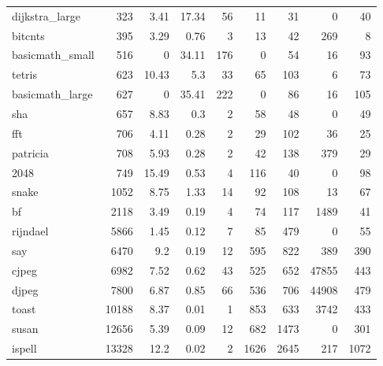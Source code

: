 \begin{tabular}{lrrrrrrrr}
 dijkstra\_large  &            323 &     3.41 &  17.34 &   56 &     11 &           31 &     0 &    40 \\
 bitcnts         &            395 &     3.29 &   0.76 &    3 &     13 &           42 &   269 &     8 \\
 basicmath\_small &            516 &     0    &  34.11 &  176 &      0 &           54 &    16 &    93 \\
 tetris          &            623 &    10.43 &   5.3  &   33 &     65 &          103 &     6 &    73 \\
 basicmath\_large &            627 &     0    &  35.41 &  222 &      0 &           86 &    16 &   105 \\
 sha             &            657 &     8.83 &   0.3  &    2 &     58 &           48 &     0 &    49 \\
 fft             &            706 &     4.11 &   0.28 &    2 &     29 &          102 &    36 &    25 \\
 patricia        &            708 &     5.93 &   0.28 &    2 &     42 &          138 &   379 &    29 \\
 2048            &            749 &    15.49 &   0.53 &    4 &    116 &           40 &     0 &    98 \\
 snake           &           1052 &     8.75 &   1.33 &   14 &     92 &          108 &    13 &    67 \\
 bf              &           2118 &     3.49 &   0.19 &    4 &     74 &          117 &  1489 &    41 \\
 rijndael        &           5866 &     1.45 &   0.12 &    7 &     85 &          479 &     0 &    55 \\
 say             &           6470 &     9.2  &   0.19 &   12 &    595 &          822 &   389 &   390 \\
 cjpeg           &           6982 &     7.52 &   0.62 &   43 &    525 &          652 & 47855 &   443 \\
 djpeg           &           7800 &     6.87 &   0.85 &   66 &    536 &          706 & 44908 &   479 \\
 toast           &          10188 &     8.37 &   0.01 &    1 &    853 &          633 &  3742 &   433 \\
 susan           &          12656 &     5.39 &   0.09 &   12 &    682 &         1473 &     0 &   301 \\
 ispell          &          13328 &    12.2  &   0.02 &    2 &   1626 &         2645 &   217 &  1072 \\
\hline

\end{tabular}
